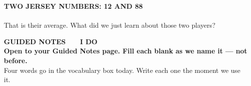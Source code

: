 \documentclass[aspectratio=169, 11pt]{beamer}
\begin{document}
{
\begin{frame}[plain]
  \vspace{1.4cm}
  \begin{center}
    {\color{skymid}\bfseries\small TWO JERSEY NUMBERS: 12 AND 88}\\[0.9cm]
    {\color{white}\bfseries\fontsize{60}{60}}\\[0.8cm]
    {\color{goldacc}\small That is their average. What did we just learn about those
    two players?}
  \end{center}
\end{frame}
}

{
\begin{frame}[plain]
  \vspace{1.8cm}\hspace{0.8cm}%
  \begin{minipage}{0.86\textwidth}
    {\color{goldacc}\bfseries\small GUIDED NOTES \ \textbullet\ \ I DO}\\[0.7cm]
    {\color{white}\bfseries\Large Open to your Guided Notes page. Fill each blank as we
    name it --- not before.}\\[0.9cm]
    {\color{skymid}\small Four words go in the vocabulary box today. Write each one the
    moment we use it.}
  \end{minipage}
\end{frame}
}
\end{document}
